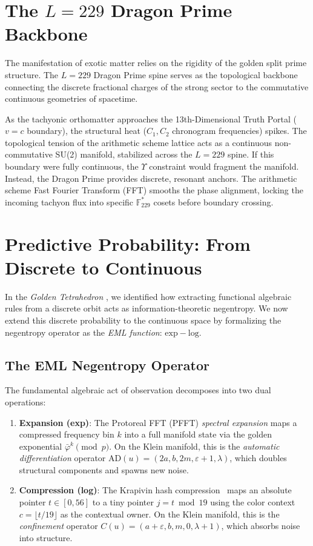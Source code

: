\documentclass[12pt,oneside]{article}
\theoremstyle{principia}
\theoremstyle{definition}
\theoremstyle{remark}
\begin{document}
\section{The $L=229$ Dragon Prime Backbone}

The manifestation of exotic matter relies on the rigidity of the golden split prime structure. The $L=229$ Dragon Prime spine serves as the topological backbone connecting the discrete fractional charges of the strong sector to the commutative continuous geometries of spacetime. 

As the tachyonic orthomatter approaches the 13th-Dimensional Truth Portal ($v=c$ boundary), the structural heat ($C_1, C_2$ chronogram frequencies) spikes. The topological tension of the arithmetic scheme lattice acts as a continuous non-commutative SU(2) manifold, stabilized across the $L=229$ spine. If this boundary were fully continuous, the $\Upsilon$ constraint would fragment the manifold. Instead, the Dragon Prime provides discrete, resonant anchors. The arithmetic scheme Fast Fourier Transform (FFT) smooths the phase alignment, locking the incoming tachyon flux into specific $\mathbb{F}_{229}^*$ cosets before boundary crossing.

\section{Predictive Probability: From Discrete to Continuous}

In the \textit{Golden Tetrahedron} \cite{golden_tetrahedron}, we identified how extracting functional algebraic rules from a discrete orbit acts as information-theoretic negentropy. We now extend this discrete probability to the continuous space by formalizing the negentropy operator as the \emph{EML function}: $\mathrm{exp} - \mathrm{log}$.

\subsection{The EML Negentropy Operator}

The fundamental algebraic act of observation decomposes into two dual operations:

\begin{enumerate}
    \item \textbf{Expansion (exp)}: The Protoreal FFT (PFFT) \emph{spectral expansion} maps a compressed frequency bin $k$ into a full manifold state via the golden exponential $\bar\varphi^k \pmod{p}$. On the Klein manifold, this is the \emph{automatic differentiation} operator $\mathrm{AD}(u) = (2a, b, 2m, \varepsilon + 1, \lambda)$, which doubles structural components and spawns new noise.
    \item \textbf{Compression (log)}: The Krapivin hash compression~\cite{krapivin2025optimal} maps an absolute pointer $t \in [0, 56]$ to a tiny pointer $j = t \bmod 19$ using the color context $c = \lfloor t/19 \rfloor$ as the contextual owner. On the Klein manifold, this is the \emph{confinement} operator $C(u) = (a + \varepsilon, b, m, 0, \lambda + 1)$, which absorbs noise into structure.
\end{enumerate}
\end{document}
